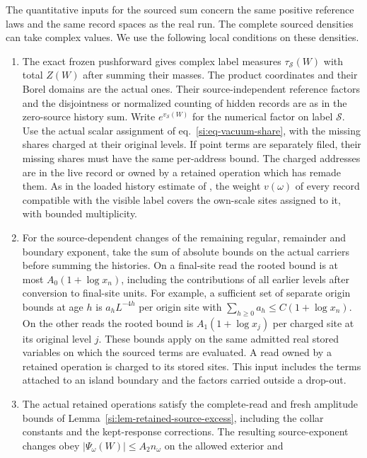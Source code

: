 \documentclass[11pt,letterpaper,reqno]{amsart}
\numberwithin{equation}{section}
\renewcommand{\eqref}[1]{\textup{eq.~\ref{#1}}}
\theoremstyle{definition}
\theoremstyle{remark}
\begin{document}
The quantitative inputs for the sourced sum concern the same
positive reference laws and the same record spaces as the real run.
The complete sourced densities can take complex values. We use the
following local conditions on these densities.

\begin{enumerate}
\item The exact frozen pushforward gives complex label measures
  $\tau_{\mathcal S}(W)$ with total $Z(W)$ after summing their
  masses. The product coordinates and their Borel domains are the
  actual ones. Their source-independent reference factors and the
  disjointness or normalized counting of hidden records are as in
  the zero-source history sum. Write $e^{v_{\mathcal S}(W)}$ for the
  numerical factor on label $\mathcal S$. Use the actual scalar
  assignment of \eqref{si:eq-vacuum-share}, with the missing shares
  charged at their original levels. If point terms are separately
  filed, their missing shares must have the same per-address bound.
  The charged addresses are in the live record or owned by a
  retained operation which has remade them. As in the loaded
  history estimate of \cite[Proposition~8.5]{RT}, the weight
  $v(\omega)$ of every record compatible with the visible label
  covers the own-scale sites assigned to it, with bounded
  multiplicity.
\item For the source-dependent changes of the remaining regular,
  remainder and boundary exponent, take the sum of absolute
  bounds on the actual carriers before summing the histories.
  On a final-site read the rooted bound is at most
  $A_0(1+\log x_n)$, including the contributions of all earlier
  levels after conversion to final-site units. For example, a
  sufficient set of separate origin bounds at age $h$ is
  $a_h L^{-4h}$ per origin site with
  $\sum_{h\ge0}a_h\le C(1+\log x_n)$. On the other reads the rooted bound is
  $A_1(1+\log x_j)$ per charged site at its original level $j$.
  These bounds apply on the same admitted real stored variables
  on which the sourced terms are evaluated. A read owned by a
  retained operation is charged to its stored sites. This input
  includes the terms attached to an island boundary and the
  factors carried outside a drop-out.
\item The actual retained operations satisfy the complete-read
  and fresh amplitude bounds of Lemma~\ref{si:lem-retained-source-excess},
  including the collar constants and the kept-response corrections.
  The resulting source-exponent changes obey
  $|\Psi_\omega(W)|\le A_2 n_\omega$ on the allowed exterior and

\end{enumerate}
\end{document}
